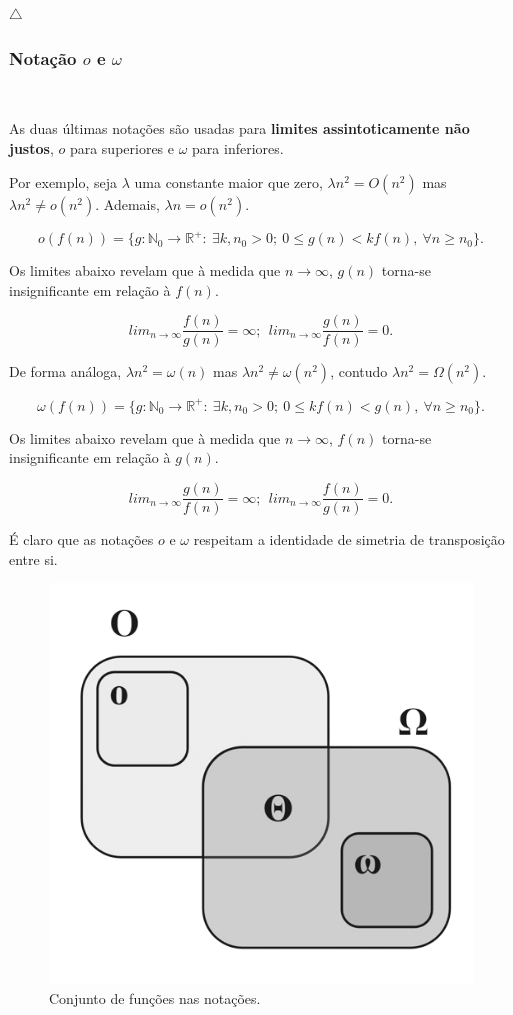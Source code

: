 {\raggedleft $\bigtriangleup$ \par}

\subsubsection{Notação $o$ e $\omega$}
\

As duas últimas notações são usadas para \textbf{limites assintoticamente não justos}, $o$ para superiores e $\omega$ para inferiores.

Por exemplo, seja $\lambda$ uma constante maior que zero, $\lambda n^2 = O(n^2)$ mas $\lambda n^2 \neq o(n^2)$. Ademais, $\lambda n = o(n^2)$.

\[o(f(n)) = \{g: \mathbb{N}_0 \rightarrow \mathbb{R}^{+}: \ \exists k, n_0 > 0 ; \ 0\leq g(n) < kf(n), \ \forall n \geq n_0\}.\]

Os limites abaixo revelam que à medida que $n \rightarrow \infty$, $g(n)$ torna-se insignificante em relação à $f(n)$.

\[lim_{n\rightarrow\infty} \frac{f(n)}{g(n)}=\infty; \ \ lim_{n\rightarrow\infty} \frac{g(n)}{f(n)}=0.\]

De forma análoga, $\lambda n^2 = \omega(n)$ mas $\lambda n^2 \neq \omega(n^2)$, contudo $\lambda n^2 = \Omega(n^2)$.

\[\omega(f(n)) = \{g: \mathbb{N}_0 \rightarrow \mathbb{R}^{+}:  \ \exists k, n_0 > 0 ; \ 0\leq kf(n) < g(n), \ \forall n \geq n_0\} .\]

Os limites abaixo revelam que à medida que $n \rightarrow \infty$, $f(n)$ torna-se insignificante em relação à $g(n)$.

\[lim_{n\rightarrow\infty} \frac{g(n)}{f(n)}=\infty; \ \ lim_{n\rightarrow\infty} \frac{f(n)}{g(n)}=0.\]

É claro que as notações $o$ e $\omega$ respeitam a identidade de simetria de transposição entre si.

\begin{figure}
  \centering
  \includegraphics[width=0.4\linewidth]{img/conjuntonotacoes.png}
    \caption{Conjunto de funções nas notações.}
    \label{conjuntonotacoes}
\end{figure}

